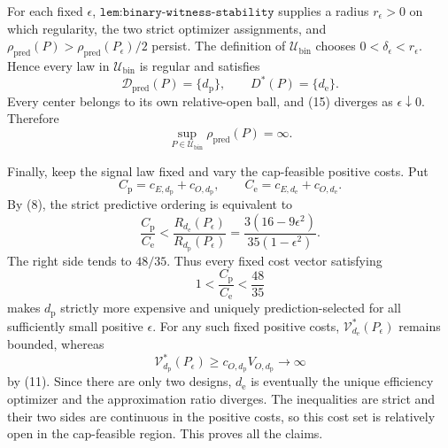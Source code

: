For each fixed \(\epsilon\), \(\texttt{lem:binary-witness-stability}\) supplies a radius \(r_\epsilon>0\) on which regularity, the two strict optimizer assignments, and
\(\rho_{\mathrm{pred}}(P)>\rho_{\mathrm{pred}}(P_\epsilon)/2\) persist.  The definition of \(\mathcal U_{\mathrm{bin}}\) chooses \(0<\delta_\epsilon<r_\epsilon\).  Hence every law in \(\mathcal U_{\mathrm{bin}}\) is regular and satisfies
\[
 \mathcal D_{\mathrm{pred}}(P)=\{d_{\mathrm p}\},
 \qquad
 D^*(P)=\{d_{\mathrm e}\}.
\]
Every center belongs to its own relative-open ball, and (15) diverges as \(\epsilon\downarrow0\).  Therefore
\[
 \sup_{P\in\mathcal U_{\mathrm{bin}}}\rho_{\mathrm{pred}}(P)=\infty. \tag{16}
\]

Finally, keep the signal law fixed and vary the cap-feasible positive costs.  Put
\[
 C_{\mathrm p}=c_{E,d_{\mathrm p}}+c_{O,d_{\mathrm p}},
 \qquad
 C_{\mathrm e}=c_{E,d_{\mathrm e}}+c_{O,d_{\mathrm e}}.
\]
By (8), the strict predictive ordering is equivalent to
\[
 \frac{C_{\mathrm p}}{C_{\mathrm e}}
 <\frac{R_{d_{\mathrm e}}(P_\epsilon)}{R_{d_{\mathrm p}}(P_\epsilon)}
 =\frac{3(16-9\epsilon^2)}{35(1-\epsilon^2)}. \tag{17}
\]
The right side tends to \(48/35\).  Thus every fixed cost vector satisfying
\[
 1<\frac{C_{\mathrm p}}{C_{\mathrm e}}<\frac{48}{35}
\]
makes \(d_{\mathrm p}\) strictly more expensive and uniquely prediction-selected for all sufficiently small positive \(\epsilon\).  For any such fixed positive costs, \(\mathcal V_{d_{\mathrm e}}^*(P_\epsilon)\) remains bounded, whereas
\[
 \mathcal V_{d_{\mathrm p}}^*(P_\epsilon)
 \ge c_{O,d_{\mathrm p}}V_{O,d_{\mathrm p}}\longrightarrow\infty
\]
by (11).  Since there are only two designs, \(d_{\mathrm e}\) is eventually the unique efficiency optimizer and the approximation ratio diverges.  The inequalities are strict and their two sides are continuous in the positive costs, so this cost set is relatively open in the cap-feasible region.  This proves all the claims.